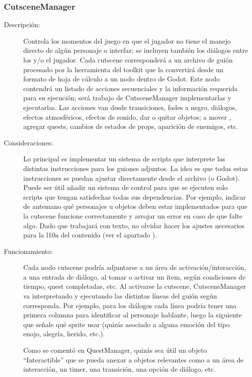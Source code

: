 \subsubsection{CutsceneManager}\label{modelado:cutscenemanager}
\begin{description}
	\item[Descripción:] Controla los momentos del juego en que el jugador no tiene el manejo directo de algún personaje o interfaz; se incluyen también los diálogos entre los  y/o el jugador. Cada cutscene corresponderá a un archivo de guión procesado por la herramienta del toolkit que la convertirá desde un formato de hoja de cálculo a un nodo dentro de Godot. Este nodo contendrá un listado de acciones secuenciales y la información requerida para su ejecución; será trabajo de CutsceneManager implementarlas y ejecutarlas. Las acciones van desde transiciones, fades a negro, diálogos, efectos atmosféricos, efectos de sonido, dar o quitar objetos; a mover , agregar quests, cambios de estados de props, aparición de enemigos, etc.
	
	\item[Consideraciones:] Lo principal es implementar un sistema de scripts que interprete las distintas instrucciones para los guiones adjuntos. La idea es que todas estas instrucciones se puedan ajustar directamente desde el archivo (o Godot). Puede ser útil añadir un sistema de control para que se ejecuten solo scripts que tengan satisfechas todas sus dependencias. Por ejemplo, indicar de antemano qué personajes u objetos deben estar implementados para que la cutscene funcione correctamente y arrojar un error en caso de que falte algo. Dado que trabajará con texto, no olvidar hacer los ajustes necesarios para la l10n del contenido (ver el apartado ).
	
	\item[Funcionamiento:] Cada nodo cutscene podría adjuntarse a un área de activación/interacción, a una entrada de diálogo, al tomar o activar un ítem, según condiciones de tiempo, quest completadas, etc. Al activarse la cutscene, CutsceneManager va interpretando y ejecutando las distintas líneas del guión según corresponda. Por ejemplo, para los diálogos cada línea podría tener una primera columna para identificar al personaje hablante, luego la siguiente que señale qué sprite usar (quizás asociado a alguna emoción del tipo enojo, alegría, herido, etc.).
	
	Como se comentó en QuestManager, quizás sea útil un objeto “Interactible” que se pueda anexar a objetos relevantes como a un área de interacción, un timer, una transición, una opción de diálogo, etc.
\end{description}
	

